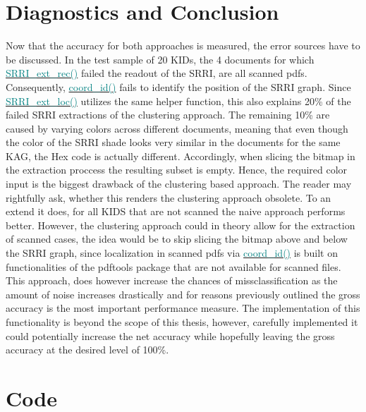 \documentclass[aodsor,preprint]{imsart}
\numberwithin{equation}{section}
\theoremstyle{plain}
\begin{document}
\section{Diagnostics and Conclusion}
Now that the accuracy for both approaches is measured, the error sources have to be discussed. In the test sample of 20 KIDs, the 4 documents for which \href{https://github.com/Base-R-Best-R/KID/blob/main/Code/Package/KIDs/R/SRRI_ext_rec.R}{\textcolor{teal}{SRRI\_ext\_rec()}} failed the readout of the SRRI, are all scanned pdfs. Consequently, \href{https://github.com/Base-R-Best-R/KID/blob/main/Code/Package/KIDs/R/coord_id.R}{\textcolor{teal}{coord\_id()}} fails to identify the position of the SRRI graph. Since \href{https://github.com/Base-R-Best-R/KID/blob/main/Code/Package/KIDs/R/SRRI_ext_loc.R}{\textcolor{teal}{SRRI\_ext\_loc()}} utilizes the same helper function, this also explains 20\% of the failed SRRI extractions of the clustering approach. The remaining 10\% are caused by varying colors across different documents, meaning that even though the color of the SRRI shade looks very similar in the documents for the same KAG, the Hex code is actually different. Accordingly, when slicing the bitmap in the extraction proccess the resulting subset is empty. Hence, the required color input is the biggest drawback of the clustering based approach. The reader may rightfully ask, whether this renders the clustering approach obsolete. To an extend it does, for all KIDS that are not scanned the naive approach performs better. However, the clustering approach could in theory allow for the extraction of scanned cases, the idea would be to skip slicing the bitmap above and below the SRRI graph, since localization in scanned pdfs via \href{https://github.com/Base-R-Best-R/KID/blob/main/Code/Package/KIDs/R/coord_id.R}{\textcolor{teal}{coord\_id()}} is built on functionalities of the pdftools package that are not available for scanned files. This approach, does however increase the chances of missclassification as the amount of noise increases drastically and for reasons previously outlined the gross accuracy is the most important performance measure. The implementation of this functionality is beyond the scope of this thesis, however, carefully implemented it could potentially increase the net accuracy while hopefully leaving the gross accuracy at the desired level of 100\%.

\newpage

\appendix

\section{Code}
\label{sec:app}
\end{document}
